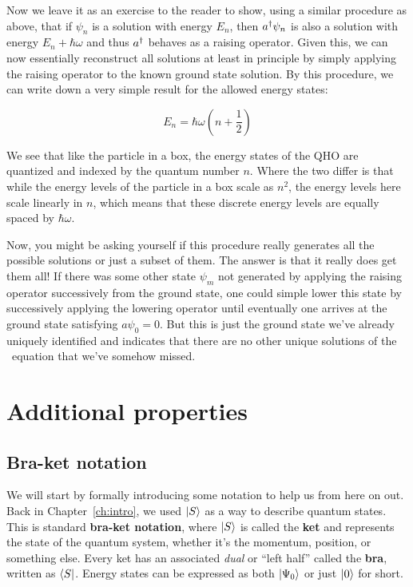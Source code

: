 Now we leave it as an exercise to the reader to show, using a similar procedure as above, that if $\psi_n$ is a solution with energy $E_n$, then $a^{\dagger}\psi_n$ is also a solution with energy $E_n+\hbar\omega$ and thus $a^{\dagger}$ behaves as a raising operator. Given this, we can now essentially reconstruct all solutions at least in principle by simply applying the raising operator to the known ground state solution. By this procedure, we can write down a very simple result for the allowed energy states:
\begin{tcolorbox}[title = Allowed energy states of the QHO] \vspace{-2ex}
	\begin{equation}
		E_n = \hbar\omega\left(n + \frac{1}{2}\right) \label{eq:estates-qho}
	\end{equation}
\end{tcolorbox}

We see that like the particle in a box, the energy states of the QHO are quantized and indexed by the quantum number $n$. Where the two differ is that while the energy levels of the particle in a box scale as $n^2$, the energy levels here scale linearly in $n$, which means that these discrete energy levels are equally spaced by $\hbar\omega$. \par 

Now, you might be asking yourself if this procedure really generates all the possible solutions or just a subset of them. The answer is that it really does get them all! If there was some other state $\psi_m$ not generated by applying the raising operator successively from the ground state, one could simple lower this state by successively applying the lowering operator until eventually one arrives at the ground state satisfying $a\psi_0 = 0$. But this is just the ground state we've already uniquely identified and indicates that there are no other unique solutions of the \Sch\ equation that we've somehow missed.


\section{Additional properties}
\subsection{Bra-ket notation} \label{sec:braket}
We will start by formally introducing some notation to help us from here on out. Back in Chapter~\ref{ch:intro}, we used $\ket{S}$ as a way to describe quantum states. This is standard \textbf{bra-ket notation}, where $\ket{S}$ is called the \textbf{ket} and represents the state of the quantum system, whether it's the momentum, position, or something else. Every ket has an associated \emph{dual} or ``left half'' called the \textbf{bra}, written as $\bra{S}$. Energy states can be expressed as both $\ket{\Psi_0}$ or just $\ket{0}$ for short. \par 

